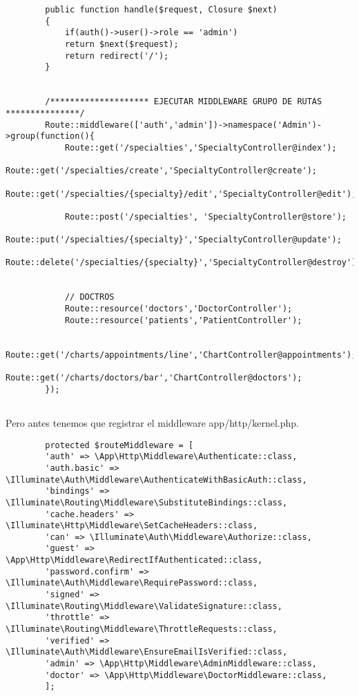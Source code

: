 \documentclass[a4paper]{article}
\begin{document}
	\begin{lstlisting}
		public function handle($request, Closure $next)
		{
			if(auth()->user()->role == 'admin')
			return $next($request);
			return redirect('/');
		}
	
	
		/******************** EJECUTAR MIDDLEWARE GRUPO DE RUTAS ***************/
		Route::middleware(['auth','admin'])->namespace('Admin')->group(function(){
			Route::get('/specialties','SpecialtyController@index');
			Route::get('/specialties/create','SpecialtyController@create');
			Route::get('/specialties/{specialty}/edit','SpecialtyController@edit');
			
			Route::post('/specialties', 'SpecialtyController@store');
			Route::put('/specialties/{specialty}','SpecialtyController@update');
			Route::delete('/specialties/{specialty}','SpecialtyController@destroy');
			
			
			// DOCTROS
			Route::resource('doctors','DoctorController');
			Route::resource('patients','PatientController');
			
			Route::get('/charts/appointments/line','ChartController@appointments');
			Route::get('/charts/doctors/bar','ChartController@doctors');
		});
		
	\end{lstlisting}

	Pero antes tenemos que registrar el middleware app/http/kernel.php.
	
	\begin{lstlisting}
		protected $routeMiddleware = [
		'auth' => \App\Http\Middleware\Authenticate::class,
		'auth.basic' => \Illuminate\Auth\Middleware\AuthenticateWithBasicAuth::class,
		'bindings' => \Illuminate\Routing\Middleware\SubstituteBindings::class,
		'cache.headers' => \Illuminate\Http\Middleware\SetCacheHeaders::class,
		'can' => \Illuminate\Auth\Middleware\Authorize::class,
		'guest' => \App\Http\Middleware\RedirectIfAuthenticated::class,
		'password.confirm' => \Illuminate\Auth\Middleware\RequirePassword::class,
		'signed' => \Illuminate\Routing\Middleware\ValidateSignature::class,
		'throttle' => \Illuminate\Routing\Middleware\ThrottleRequests::class,
		'verified' => \Illuminate\Auth\Middleware\EnsureEmailIsVerified::class,
		'admin' => \App\Http\Middleware\AdminMiddleware::class,
		'doctor' => \App\Http\Middleware\DoctorMiddleware::class,
		];
	\end{lstlisting}
	
\end{document}
